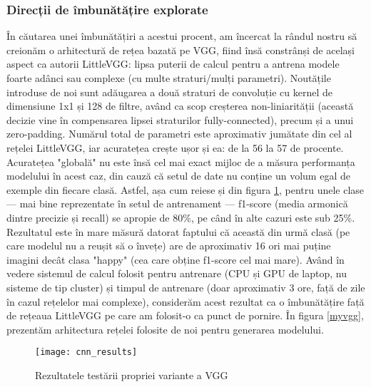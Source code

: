 \documentclass{article}
\begin{document}
\subsubsection{Direcții de îmbunătățire explorate}
În căutarea unei îmbunătățiri a acestui procent, am încercat la rândul nostru să creionăm o arhitectură de rețea bazată pe VGG, fiind însă constrânși de același aspect ca autorii LittleVGG: lipsa puterii de calcul pentru a antrena modele foarte adânci sau complexe (cu multe straturi/mulți parametri). Noutățile introduse de noi sunt adăugarea a două straturi de convoluție cu kernel de dimensiune 1x1 și 128 de filtre, având ca scop creșterea non-liniarității (această decizie vine în compensarea lipsei straturilor fully-connected), precum și a unui zero-padding. Numărul total de parametri este aproximativ jumătate din cel al rețelei LittleVGG, iar acuratețea crește ușor și ea: de la 56 la 57 de procente. Acuratețea "globală" nu este însă cel mai exact mijloc de a măsura performanța modelului în acest caz, din cauză că setul de date nu conține un volum egal de exemple din fiecare clasă. Astfel, așa cum reiese și din figura \ref{myvgg_test}, pentru unele clase --- mai bine reprezentate în setul de antrenament --- f1-score (media armonică dintre precizie și recall) se apropie de 80\%, pe când în alte cazuri este sub 25\%. Rezultatul este în mare măsură datorat faptului că această din urmă clasă (pe care modelul nu a reușit să o învețe) are de aproximativ 16 ori mai puține imagini decât clasa "happy" (cea care obține f1-score cel mai mare).  Având în vedere sistemul de calcul folosit pentru antrenare (CPU și GPU de laptop, nu sisteme de tip cluster) și timpul de antrenare (doar aproximativ 3 ore, față de zile în cazul rețelelor mai complexe), considerăm acest rezultat ca o îmbunătățire față de rețeaua LittleVGG pe care am folosit-o ca punct de pornire. În figura \ref{myvgg}, prezentăm arhitectura rețelei folosite de noi pentru generarea modelului.

\begin{figure}[t]
    \centering
    \texttt{[image: cnn\_results]}
    \caption{Rezultatele testării propriei variante a VGG}
    \label{myvgg_test}
\end{figure}
\end{document}
